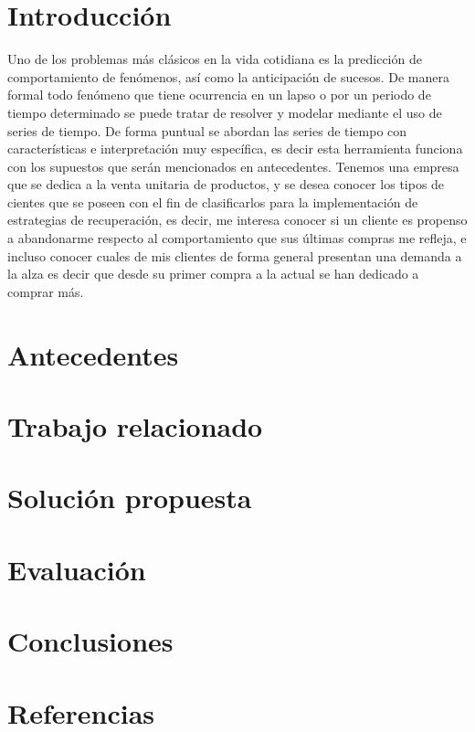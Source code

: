 \documentclass[preprint,12pt]{elsarticle}
\begin{document}

\section{Introducción}
Uno de los problemas más clásicos en la vida cotidiana es la predicción de comportamiento de fenómenos, así como la anticipación de sucesos. De manera formal todo fenómeno que tiene ocurrencia en un lapso o por un periodo de tiempo determinado se puede tratar de resolver y modelar mediante el uso de series de tiempo. 
De forma puntual se abordan las series de tiempo con características e interpretación muy específica, es decir esta herramienta funciona con los supuestos que serán mencionados en antecedentes. Tenemos una empresa que se dedica a la venta unitaria de productos, y se desea conocer los tipos de cientes que se poseen con el fin de clasificarlos para la implementación de estrategias de recuperación, es decir, me interesa conocer si un cliente es propenso a abandonarme respecto al comportamiento que sus últimas compras me refleja, e incluso conocer cuales de mis clientes de forma general presentan una demanda a la alza es decir que desde su primer compra a la actual se han dedicado a comprar más.
\section{Antecedentes}

\section{Trabajo relacionado}
\section{Solución propuesta}

\section{Evaluación}

\section{Conclusiones}

\section{Referencias}

\end{document}

